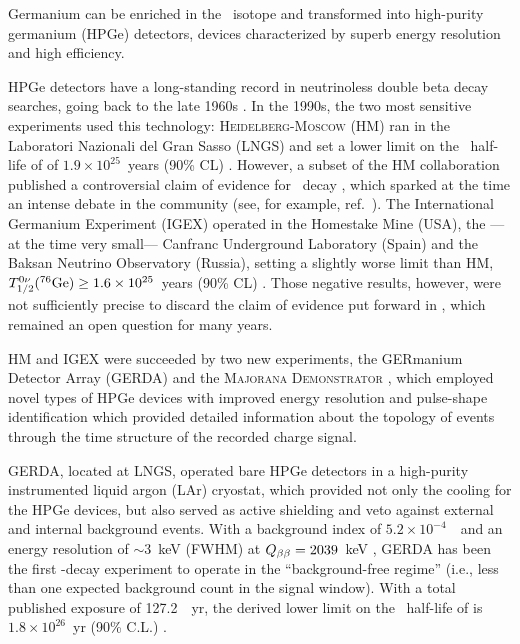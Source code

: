 %
Germanium can be enriched in the \bb\ isotope and transformed into high-purity germanium (HPGe) detectors, devices characterized by superb energy resolution and high efficiency. 

HPGe detectors have a long-standing record in neutrinoless double beta decay searches, going back to the late 1960s \cite{Fiorini:1967in,Fiorini:1970}. In the 1990s, the two most sensitive experiments used this technology: \textsc{Heidelberg-Moscow} (HM) ran in the Laboratori Nazionali del Gran Sasso (LNGS) and set a lower limit on the \bbonu\ half-life of  of $1.9 \times 10^{25}$~years (90\% CL) \cite{Klapdor-Kleingrothaus:2000eir}. However, a subset of the HM collaboration published a controversial claim of evidence for \bbonu\ decay \cite{Klapdor-Kleingrothaus:2001oba, Klapdor-Kleingrothaus:2006zcr}, which sparked at the time an intense debate in the community (see, for example, ref.~\cite{Aalseth:2002dt}). The International Germanium Experiment (IGEX) operated in the Homestake Mine (USA), the ---at the time very small--- Canfranc Underground Laboratory (Spain) and the Baksan Neutrino Observatory (Russia), setting a slightly worse limit than HM, $T^{0\nu}_{1/2}(^{76}\mathrm{Ge}) \geq 1.6 \times 10^{25}$~years (90\% CL) \cite{IGEX:2002bce}. Those negative results, however, were not sufficiently precise to discard the claim of evidence put forward in \cite{Klapdor-Kleingrothaus:2001oba, Klapdor-Kleingrothaus:2006zcr}, which remained an open question for many years. 

HM and IGEX were succeeded by two new experiments, the GERmanium Detector Array (GERDA) \cite{GERDA:2020xhi} and the \textsc{Majorana Demonstrator} \cite{Majorana:2022udl}, which employed novel types of HPGe devices with improved energy resolution and pulse-shape identification which provided detailed information about the topology of events through the time structure of the recorded charge signal.

GERDA, located at LNGS, operated bare HPGe detectors in a high-purity instrumented liquid argon (LAr) cryostat, which provided not only the cooling for the HPGe devices, but also served as active shielding and veto against external and internal background events. With a background index of $5.2\times10^{-4}$~\ckky\ and an energy resolution of $\sim3$~keV (FWHM) at $Q_{\beta\beta}=2039$~keV \cite{GERDA:2020xhi}, GERDA has been the first \bbonu-decay experiment to operate in the ``background-free regime'' (i.e., less than one expected background count in the signal window). With a total published exposure of 127.2~\kgbb~yr, the derived lower limit on the \bbonu\ half-life of  is $1.8\times10^{26}$~yr (90\% C.L.) \cite{GERDA:2020xhi}. 

